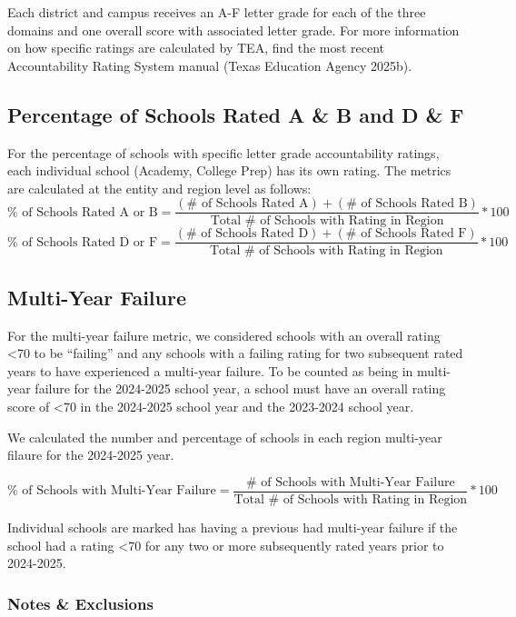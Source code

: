 \documentclass[
  letterpaper,
  DIV=11,
  numbers=noendperiod]{scrreprt}
\begin{document}
Each district and campus receives an A-F letter grade for each of the
three domains and one overall score with associated letter grade. For
more information on how specific ratings are calculated by TEA, find the
most recent Accountability Rating System manual (Texas Education Agency
2025b).

\subsection{Percentage of Schools Rated A \& B and D \&
F}\label{percentage-of-schools-rated-a-b-and-d-f}

For the percentage of schools with specific letter grade accountability
ratings, each individual school (Academy, College Prep) has its own
rating. The metrics are calculated at the entity and region level as
follows:
\[{\% \text{ of Schools Rated A or B}} = \frac{(\# \text{ of Schools Rated A}) + (\# \text{ of Schools Rated B})}{\text{Total } \# \text{ of Schools with Rating in Region}}*100\]
\[{\% \text{ of Schools Rated D or F}} = \frac{(\# \text{ of Schools Rated D}) + (\# \text{ of Schools Rated F})}{\text{Total } \# \text{ of Schools with Rating in Region}}*100\]

\subsection{Multi-Year Failure}\label{sec-Fail}

For the multi-year failure metric, we considered schools with an overall
rating \textless70 to be ``failing'' and any schools with a failing
rating for two subsequent rated years to have experienced a multi-year
failure. To be counted as being in multi-year failure for the 2024-2025
school year, a school must have an overall rating score of \textless70
in the 2024-2025 school year and the 2023-2024 school year.

We calculated the number and percentage of schools in each region
multi-year filaure for the 2024-2025 year.

\[{\% \text{ of Schools with Multi-Year Failure}} = \frac{\# \text{ of Schools with Multi-Year Failure}}{\text{Total } \# \text{ of Schools with Rating in Region}}*100\]

Individual schools are marked has having a previous had multi-year
failure if the school had a rating \textless70 for any two or more
subsequently rated years prior to 2024-2025.

\subsubsection{Notes \& Exclusions}\label{notes-exclusions-1}
\end{document}
